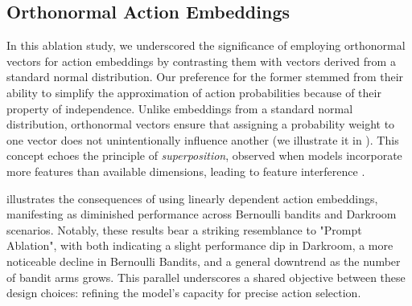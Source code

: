\subsection{Orthonormal Action Embeddings}
In this ablation study, we underscored the significance of employing orthonormal vectors for action embeddings by contrasting them with vectors derived from a standard normal distribution. Our preference for the former stemmed from their ability to simplify the approximation of action probabilities because of their property of independence. Unlike embeddings from a standard normal distribution, orthonormal vectors ensure that assigning a probability weight to one vector does not unintentionally influence another (we illustrate it in ). This concept echoes the principle of \textit{superposition}, observed when models incorporate more features than available dimensions, leading to feature interference \cite{elhage2022superposition}.

 illustrates the consequences of using linearly dependent action embeddings, manifesting as diminished performance across Bernoulli bandits and Darkroom scenarios. Notably, these results bear a striking resemblance to "Prompt Ablation", with both indicating a slight performance dip in Darkroom, a more noticeable decline in Bernoulli Bandits, and a general downtrend as the number of bandit arms grows. This parallel underscores a shared objective between these design choices: refining the model's capacity for precise action selection.



